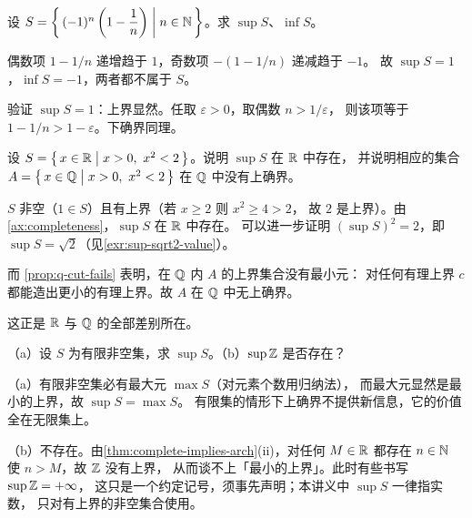 \begin{example}[两端都取不到]
  \label{ex:sup-alternating}
  设 \(S = \left\{\,(-1)^{n}\left(1 - \dfrac{1}{n}\right) \;\middle|\; n \in \mathbb{N}\,\right\}\)。求 \(\sup S\)、\(\inf S\)。
  \begin{worked}
    偶数项 \(1 - 1/n\) 递增趋于 \(1\)，奇数项 \(-(1-1/n)\) 递减趋于 \(-1\)。
    故 \(\sup S = 1\)，\(\inf S = -1\)，两者都不属于 \(S\)。

    验证 \(\sup S = 1\)：上界显然。任取 \(\varepsilon > 0\)，取偶数 \(n > 1/\varepsilon\)，
    则该项等于 \(1 - 1/n > 1 - \varepsilon\)。下确界同理。
  \end{worked}
\end{example}

\begin{example}[回到空隙]
  \label{ex:sup-sqrt2}
  设 \(S = \left\{\,x \in \mathbb{R} \;\middle|\; x > 0,\ x^{2} < 2\,\right\}\)。说明 \(\sup S\) 在 \(\mathbb{R}\) 中存在，
  并说明相应的集合 \(A = \left\{\,x \in \mathbb{Q} \;\middle|\; x > 0,\ x^{2} < 2\,\right\}\) 在 \(\mathbb{Q}\) 中没有上确界。
  \begin{worked}
    \(S\) 非空（\(1 \in S\)）且有上界（若 \(x \ge 2\) 则 \(x^{2} \ge 4 > 2\)，
    故 \(2\) 是上界）。由\cref{ax:completeness}，\(\sup S\) 在 \(\mathbb{R}\) 中存在。
    可以进一步证明 \((\sup S)^{2} = 2\)，即 \(\sup S = \sqrt{2}\)（见\cref{exr:sup-sqrt2-value}）。

    而 \cref{prop:q-cut-fails} 表明，在 \(\mathbb{Q}\) 内 \(A\) 的上界集合没有最小元：
    对任何有理上界 \(c\) 都能造出更小的有理上界。故 \(A\) 在 \(\mathbb{Q}\) 中无上确界。

    这正是 \(\mathbb{R}\) 与 \(\mathbb{Q}\) 的全部差别所在。
  \end{worked}
\end{example}

\begin{example}[有限集与无上界的集合]
  \label{ex:sup-finite}
  （a）设 \(S\) 为有限非空集，求 \(\sup S\)。（b）\(\sup \mathbb{Z}\) 是否存在？
  \begin{worked}
    （a）有限非空集必有最大元 \(\max S\)（对元素个数用归纳法），
    而最大元显然是最小的上界，故 \(\sup S = \max S\)。
    有限集的情形下上确界不提供新信息，它的价值全在无限集上。

    （b）不存在。由\cref{thm:complete-implies-arch}(ii)，对任何 \(M \in \mathbb{R}\)
    都存在 \(n \in \mathbb{N}\) 使 \(n > M\)，故 \(\mathbb{Z}\) 没有上界，
    从而谈不上「最小的上界」。此时有些书写 \(\sup \mathbb{Z} = +\infty\)，
    这只是一个约定记号，须事先声明；本讲义中 \(\sup S\) 一律指实数，
    只对有上界的非空集合使用。
  \end{worked}
\end{example}

